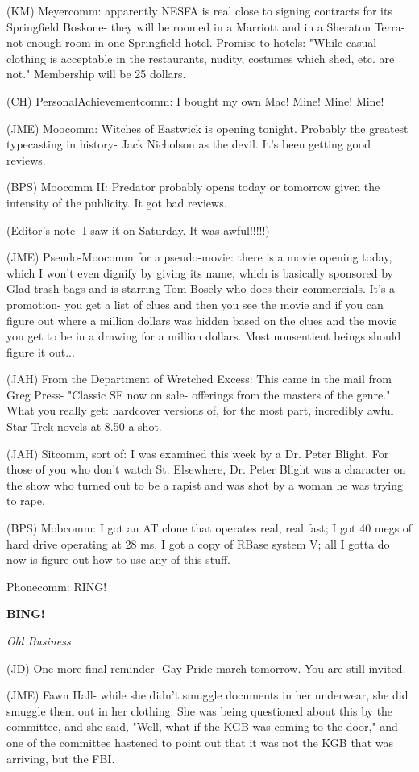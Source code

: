 \documentclass[12pt]{article}
\newcommand{\bing}{{\bf BING!} }
\newcommand{\goto}[1]{\bing \vskip 12pt \centerline{{\em{#1}}}}
\begin{document}
(KM) Meyercomm: apparently NESFA is real close to signing contracts for its Springfield Boskone- they will be roomed in a Marriott and in a Sheraton Terra- not enough room in one Springfield hotel. Promise to hotels: "While casual clothing is acceptable in the restaurants, nudity, costumes which shed,  etc. are not." Membership will be 25 dollars.

(CH) PersonalAchievementcomm: I bought my own Mac! Mine! Mine! Mine!

(JME) Moocomm: Witches of Eastwick is opening tonight. Probably the greatest typecasting in history- Jack Nicholson as the devil. It's been getting good reviews.

(BPS) Moocomm II: Predator probably opens today or tomorrow given the intensity of the publicity. It got bad reviews.

(Editor's note- I saw it on Saturday. It was awful!!!!!)

(JME) Pseudo-Moocomm for a pseudo-movie: there is a movie opening today, which I won't even dignify by giving its name, which is basically sponsored by Glad trash bags and is starring Tom Bosely who does their commercials. It's a promotion- you get a list of clues and then you see the movie and if you can figure out where a million dollars was hidden based on the clues and the movie you get to be in a drawing for a million dollars. Most nonsentient beings should figure it out...

(JAH) From the Department of Wretched Excess: This came in the mail from Greg Press- "Classic SF now on sale- offerings from the masters of the genre." What you really get: hardcover versions of, for the most part, incredibly awful Star Trek novels at 8.50 a shot.

(JAH) Sitcomm, sort of: I was examined this week by a Dr. Peter Blight. For those of you who don't watch St. Elsewhere, Dr. Peter Blight was a character on the show who turned out to be a rapist and was shot by a woman he was trying to rape.

(BPS) Mobcomm: I got an AT clone that operates real, real fast; I got 40 megs of hard drive operating at 28 ms, I got a copy of RBase system V; all I gotta do now is figure out how to use any of this stuff.

Phonecomm: RING!

\goto{Old Business}

(JD) One more final reminder- Gay Pride march tomorrow. You are still invited.

(JME) Fawn Hall- while she didn't smuggle documents in her underwear, she did smuggle them out in her clothing. She was being questioned about this by the committee, and she said, "Well, what if the KGB was coming to the door," and one of the committee hastened to point out that it was not the KGB that was arriving, but the FBI.
\end{document}
